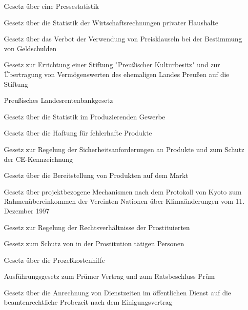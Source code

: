 \item[{PresseStatG}] Gesetz über eine Pressestatistik

\item[{PrHaushStatG}] Gesetz über die Statistik der Wirtschaftsrechnungen privater Haushalte

\item[{PrKG}] Gesetz über das Verbot der Verwendung von Preisklauseln bei der Bestimmung von Geldschulden

\item[{PrKultbG}] Gesetz zur Errichtung einer Stiftung "Preußischer Kulturbesitz" und zur Übertragung von Vermögenswerten des ehemaligen Landes Preußen auf die Stiftung

\item[{PrldRentBkG}] Preußisches Landesrentenbankgesetz

\item[{ProdGewStatG}] Gesetz über die Statistik im Produzierenden Gewerbe

\item[{ProdHaftG}] Gesetz über die Haftung für fehlerhafte Produkte

\item[{ProdSG}] Gesetz zur Regelung der Sicherheitsanforderungen an Produkte und zum Schutz der CE-Kennzeichnung

\item[{ProdSG-2011}] Gesetz über die Bereitstellung von Produkten auf dem Markt

\item[{ProMechG}] Gesetz über projektbezogene Mechanismen nach dem Protokoll von Kyoto zum Rahmenübereinkommen der Vereinten Nationen über Klimaänderungen vom 11. Dezember 1997

\item[{ProstG}] Gesetz zur Regelung der Rechtsverhältnisse der Prostituierten

\item[{ProstSchG}] Gesetz zum Schutz von in der Prostitution tätigen Personen

\item[{ProzKostHiG}] Gesetz über die Prozeßkostenhilfe

\item[{PrümVtrAG}] Ausführungsgesetz zum Prümer Vertrag und zum Ratsbeschluss Prüm

\item[{PrZAnrG}] Gesetz über die Anrechnung von Dienstzeiten im öffentlichen Dienst auf die beamtenrechtliche Probezeit nach dem Einigungsvertrag

